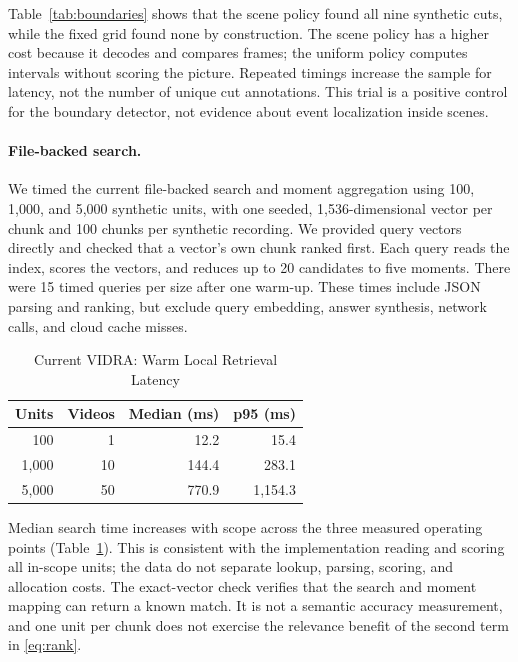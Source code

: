 Table~\ref{tab:boundaries} shows that the scene policy found all nine synthetic cuts, while the fixed grid found none by construction. The scene policy has a higher cost because it decodes and compares frames; the uniform policy computes intervals without scoring the picture. Repeated timings increase the sample for latency, not the number of unique cut annotations. This trial is a positive control for the boundary detector, not evidence about event localization inside scenes.

\paragraph{File-backed search.}
We timed the current file-backed search and moment aggregation using 100, 1,000, and 5,000 synthetic units, with one seeded, 1,536-dimensional vector per chunk and 100 chunks per synthetic recording. We provided query vectors directly and checked that a vector's own chunk ranked first. Each query reads the index, scores the vectors, and reduces up to 20 candidates to five moments. There were 15 timed queries per size after one warm-up. These times include JSON parsing and ranking, but exclude query embedding, answer synthesis, network calls, and cloud cache misses.

\begin{table}[!t]
\caption{Current VIDRA: Warm Local Retrieval Latency}
\label{tab:retrieval}
\centering
\small
\begin{tabular}{@{}rrrr@{}}
\toprule
\textbf{Units} & \textbf{Videos} & \textbf{Median (ms)} & \textbf{p95 (ms)} \\
\midrule
100 & 1 & 12.2 & 15.4 \\
1,000 & 10 & 144.4 & 283.1 \\
5,000 & 50 & 770.9 & 1,154.3 \\
\bottomrule
\end{tabular}
\end{table}

Median search time increases with scope across the three measured operating points (Table~\ref{tab:retrieval}). This is consistent with the implementation reading and scoring all in-scope units; the data do not separate lookup, parsing, scoring, and allocation costs. The exact-vector check verifies that the search and moment mapping can return a known match. It is not a semantic accuracy measurement, and one unit per chunk does not exercise the relevance benefit of the second term in \eqref{eq:rank}.


